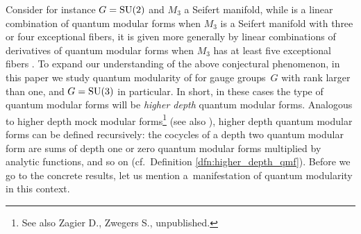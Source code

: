 \documentclass[10pt,a4paper]{amsart}
\def\bv{{\vec{\underline{b}}}}
\theoremstyle{definition}
\numberwithin{equation}{section}
\begin{document}
Consider for instance $G={\rm SU}(2)$ and $M_3$ a Seifert manifold, while \smash{$\widehat Z^G_\bv(M_3)$} is a linear combination of quantum modular forms when $M_3$ is a Seifert manifold with three or four exceptional fibers, it is given more generally by linear combinations of derivatives of quantum modular forms when $M_3$ has at least five exceptional fibers \cite{bringmann2019quantum}. To expand our understanding of the above conjectural phenomenon, in this paper we study quantum modularity of \smash{$\widehat Z^G_\bv(M_3)$} for gauge groups~$G$ with rank larger than one, and $G={\rm SU}(3)$ in particular. In short, in these cases the type of quantum modular forms will be {\it higher depth} quantum modular forms. Analogous to higher depth mock modular forms\footnote{See also Zagier D., Zwegers S., {u}npublished.} (see also \cite{Alexandrov:2020dyy,Alexandrov:2020bwg,Alexandrov:2016enp,Alexandrov:2018lgp, bringmann2019vectorvalued, bringmann2016indefinite,Bringmann:2018cov, KumarGupta:2018rac, males2021higher,Manschot:2017xcr}), higher depth quantum modular forms can be defined recursively: the cocycles of a depth two quantum modular form are sums of depth one or zero quantum modular forms multiplied by analytic functions, and so on (cf.\ Definition \ref{dfn:higher_depth_qmf}). Before we go to the concrete results, let us mention a~manifestation of quantum modularity in this context.
\end{document}

